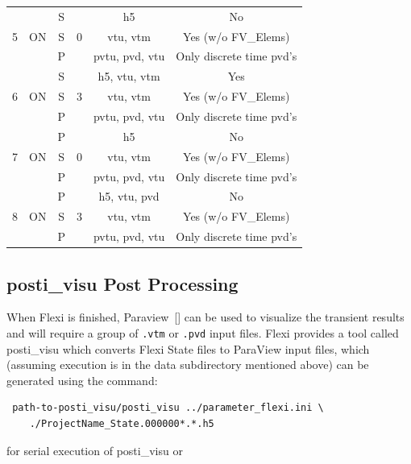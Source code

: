\begin{appendices}
\begin{table}[h!]
\begin{tabular}{|c|c|c|c|c|c|}
\multirow{3}{*}{5} & \multirow{3}{*}{ON} & S & \multirow{3}{*}{0} & h5 & No \\ \cline{3-3} \cline{5-6}
    &  &  S & & vtu, vtm & Yes (w/o FV\_Elems) \\
    &  &  P & & pvtu, pvd, vtu & Only discrete time pvd's \\ \hline

\multirow{3}{*}{6} & \multirow{3}{*}{ON} & S & \multirow{3}{*}{3} & h5, vtu, vtm & Yes \\ \cline{3-3} \cline{5-6}
   &  &  S & & vtu, vtm & Yes (w/o FV\_Elems) \\
    &  &  P & & pvtu, pvd, vtu & Only discrete time pvd's \\ \hline

\multirow{3}{*}{7} & \multirow{3}{*}{ON} & P & \multirow{3}{*}{0} & h5 & No \\ \cline{3-3} \cline{5-6}
   &  &  S & & vtu, vtm &  Yes (w/o FV\_Elems) \\
    &  &  P & & pvtu, pvd, vtu & Only discrete time pvd's  \\ \hline

\multirow{3}{*}{8} & \multirow{3}{*}{ON} & P & \multirow{3}{*}{3} & h5, vtu, pvd & No \\ \cline{3-3} \cline{5-6}
   &  &  S & & vtu, vtm & Yes  (w/o FV\_Elems)  \\
  &   &  P & & pvtu, pvd, vtu & Only discrete time pvd's \\ \hline
 \end{tabular}
\end{table}

\subsection{posti\_visu Post Processing}\label{sec:posti}

When Flexi is finished, Paraview~[\cite{ParaView}] can be used to visualize the transient results and will require a group of \verb|.vtm| or \verb|.pvd| input files.  Flexi provides a tool called posti\_visu which converts Flexi State files to ParaView input files, which (assuming execution is in the data subdirectory mentioned above) can be generated using the command:

\begin{verbatim}
 path-to-posti_visu/posti_visu ../parameter_flexi.ini \
    ./ProjectName_State.000000*.*.h5
\end{verbatim}
\noindent for serial execution of posti\_visu or


\end{appendices}
